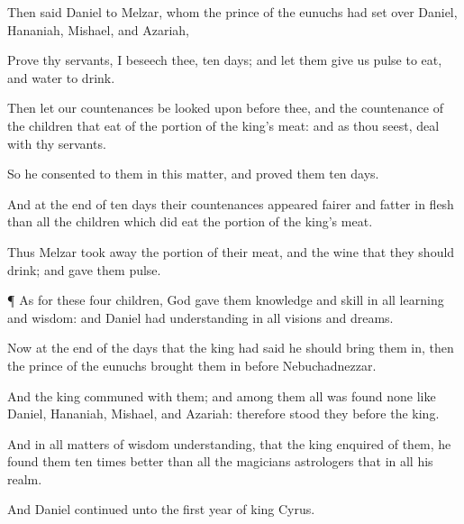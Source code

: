 {Then
said
Daniel to
Melzar, whom the
prince of the
eunuchs had
set over
Daniel,
Hananiah,
Mishael, and
Azariah,

Prove thy
servants, I beseech thee,
ten
days; and let them
give us
pulse to
eat, and
water to
drink.

Then let our
countenances be looked
upon
before thee, and the
countenance of the
children that
eat of the
portion of the
king’s
meat: and as thou
seest,
deal with thy
servants.

So he
consented to them in this
matter, and
proved them
ten
days.

And at the
end of
ten
days their
countenances
appeared
fairer and
fatter in
flesh than all the
children which did
eat the
portion of the
king’s
meat.

Thus
Melzar took
away the portion of their
meat, and the
wine that they should
drink; and
gave them
pulse.


\par }{\PP {}¶ As for these
four
children,
God
gave them
knowledge and
skill in all
learning and
wisdom: and
Daniel had
understanding in all
visions and
dreams.

Now at the
end of the
days that the
king had
said he should
bring them in, then the
prince of the
eunuchs
brought them in
before
Nebuchadnezzar.

And the
king
communed with them; and among them all was
found none like
Daniel,
Hananiah,
Mishael, and
Azariah: therefore
stood they
before the
king.

And in all
matters of
wisdom
{}
understanding, that the
king
enquired of them, he
found them ten
times
better than all the
magicians
{}
astrologers that
{} in all his
realm.

And
Daniel continued
{} unto the
first
year of
king
Cyrus.




\par }
